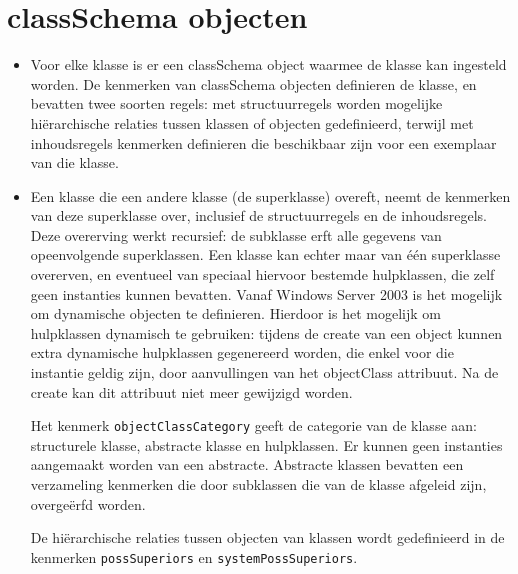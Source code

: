 \documentclass{report}
\begin{document}
	\section{classSchema objecten }
	\begin{enumerate}
		 { 
			\begin{itemize}
				\item Voor elke klasse is er een classSchema object waarmee de klasse kan ingesteld worden. De kenmerken van classSchema objecten definieren de klasse, en bevatten twee soorten regels: met structuurregels worden mogelijke hiërarchische relaties tussen klassen of objecten gedefinieerd, terwijl met inhoudsregels kenmerken definieren die beschikbaar zijn voor een exemplaar van die klasse.
			\end{itemize}	
		}
		
		 {
			\begin{itemize}
				\item Een klasse die een andere klasse (de superklasse) overeft, neemt de kenmerken van deze superklasse over, inclusief de structuurregels en de inhoudsregels. Deze overerving werkt recursief: de subklasse erft alle gegevens van opeenvolgende superklassen. Een klasse kan echter maar van één superklasse overerven, en eventueel van speciaal hiervoor bestemde hulpklassen, die zelf geen instanties kunnen bevatten. Vanaf Windows Server 2003 is het mogelijk om dynamische objecten te definieren. Hierdoor is het mogelijk om hulpklassen dynamisch te gebruiken: tijdens de create van een object kunnen extra dynamische hulpklassen gegenereerd worden, die enkel voor die instantie geldig zijn, door aanvullingen van het objectClass attribuut. Na de create kan dit attribuut niet meer gewijzigd worden.

				Het kenmerk \texttt{objectClassCategory} geeft de categorie van de klasse aan: structurele klasse, abstracte klasse en hulpklassen. Er kunnen geen instanties aangemaakt worden van een abstracte. Abstracte klassen bevatten een verzameling kenmerken die door subklassen die van de klasse afgeleid zijn, overgeërfd worden. 

				De hiërarchische relaties tussen objecten van klassen wordt gedefinieerd in de kenmerken \texttt{possSuperiors} en \texttt{systemPossSuperiors}. 
			\end{itemize}	
		}
		

\end{enumerate}
\end{document}
